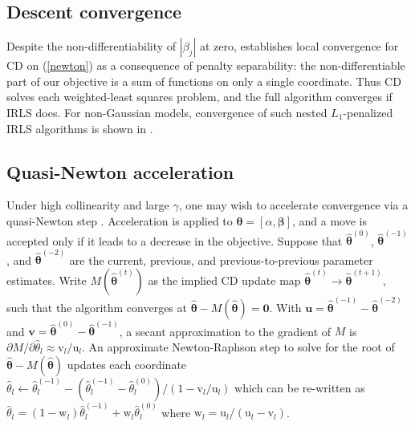 \documentclass[12pt]{article}
\newcommand{\bs}[1]{\boldsymbol{#1}}
\newcommand{\mr}[1]{\mathrm{#1}}
\newcommand{\bm}[1]{\mathbf{#1}}
\begin{document}
\subsection{Descent convergence}

 Despite the non-differentiability of $|\beta_j|$ at zero,
\citet{tseng_convergence_2001} establishes local convergence for CD on
(\ref{newton}) as a consequence of penalty separability: the
non-differentiable part of our objective is a sum of functions on only a
single coordinate.  Thus CD solves each weighted-least squares problem, and
the full algorithm converges if IRLS does.  For non-Gaussian models,
convergence of such nested $L_1$-penalized IRLS algorithms is shown
in \cite{lee_proximal_2014}.

\subsection{Quasi-Newton acceleration}
\label{qn}

Under high collinearity and large $\gamma$, one may wish to accelerate convergence via a quasi-Newton step
\citep[e.g.,][]{lange_numerical_2010}. Acceleration is applied to $\bs{\theta}
= [\alpha,\bs{\beta}]$, and a move is accepted only if it leads to a decrease
in the objective. Suppose that $\bs{\hat\theta}^{(0)}$,
$\bs{\hat\theta}^{(-1)}$, and $\bs{\hat\theta}^{(-2)}$ are the current,
previous, and previous-to-previous parameter estimates.  Write
$M(\bs{\hat\theta}^{(t)})$ as the implied CD update map $\bs{\hat\theta}^{(t)}
\rightarrow \bs{\hat\theta}^{(t+1)}$, such that the algorithm converges at
$\bs{\hat\theta} - M(\bs{\hat\theta}) = \bm{0}$.  With $\bm{u} =
\bs{\hat\theta}^{(-1)} - \bs{\hat\theta}^{(-2)}$ and $\bm{v} =
\bs{\hat\theta}^{(0)} - \bs{\hat\theta}^{(-1)}$, a secant approximation to the
gradient of $M$ is $\partial M/\partial \hat\theta_l \approx
\mr{v}_l/\mr{u}_l$.  An approximate Newton-Raphson step to solve for the root
of $\bs{\hat\theta} - M(\bs{\hat\theta}) $  updates each coordinate $\hat
\theta_l \gets \hat\theta_l^{(-1)} - (\hat\theta_l^{(-1)} -
\hat\theta_l^{(0)})/(1-\mr{v}_l/\mr{u}_l)$ which can be re-written as
$\hat\theta_l = (1-\mr{w}_l)\hat\theta_l^{(-1)} + \mr{w}_l\hat\theta_l^{(0)} $
where $\mr{w}_l = \mr{u}_l/(\mr{u}_l - \mr{v}_l)$.
\end{document}
